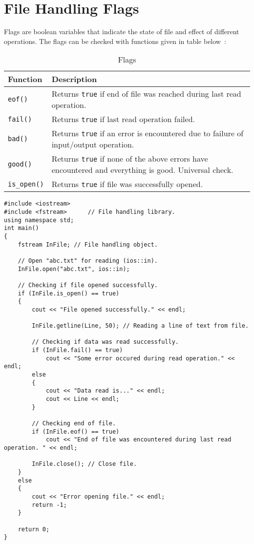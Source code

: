 \documentclass[12pt,a4paper]{article}
\begin{document}
\section{File Handling Flags}
Flags are boolean variables that indicate the state of file and effect of different operations. The flags can be checked with functions given in table below~\cite{Ref:CPP-ios-flags}:
\begin{table}[H]
\begin{center}
\vspace{0.3cm}
	\begin{tabular}{lp{9cm}}
	\hline \hline
		\textbf{Function} \rule{0pt}{2.6ex} & \textbf{Description}\\
		\hline
		\verb|eof()| \rule{0pt}{2.6ex} & Returns \verb|true| if end of file was reached during last read operation.\\
		\verb|fail()| \rule{0pt}{2.6ex} & Returns \verb|true| if last read operation failed.\\
		\verb|bad()| \rule{0pt}{2.6ex} & Returns \verb|true| if an error is encountered due to failure of input/output operation.\\
		\verb|good()| \rule{0pt}{2.6ex} & Returns \verb|true| if none of the above errors have encountered and everything is good. Universal check.\\
		\verb|is_open()| \rule{0pt}{2.6ex} & Returns \verb|true| if file was successfully opened.\\
		\hline \hline
	\end{tabular}
\end{center}
\label{Flags}
\caption{Flags}
\end{table}
\begin{lstlisting}[caption={Reading a line from text file with error checking}]
#include <iostream>
#include <fstream>		// File handling library.
using namespace std;
int main()
{
	fstream InFile;	// File handling object.

	// Open "abc.txt" for reading (ios::in).
	InFile.open("abc.txt", ios::in);

	// Checking if file opened successfully.
	if (InFile.is_open() == true)
	{
		cout << "File opened successfully." << endl;

		InFile.getline(Line, 50); // Reading a line of text from file.

		// Checking if data was read successfully.
		if (InFile.fail() == true)
			cout << "Some error occured during read operation." << endl;
		else
		{
			cout << "Data read is..." << endl;
			cout << Line << endl;
		}

		// Checking end of file.
		if (InFile.eof() == true)
			cout << "End of file was encountered during last read operation. " << endl;

		InFile.close();	// Close file.
	}
	else
	{
		cout << "Error opening file." << endl;
		return -1;
	}

	return 0;
}
\end{lstlisting}
\end{document}
